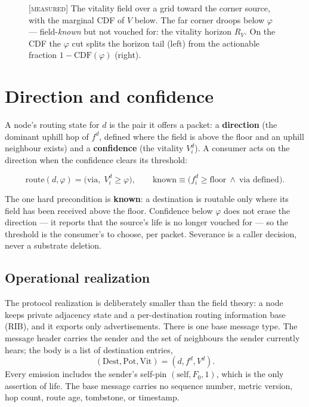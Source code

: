 \documentclass[11pt]{article}
\theoremstyle{plain}
\numberwithin{equation}{section}
\begin{document}
\begin{figure}[tbp]
\centering

\caption{\textsc{[measured]} The vitality field over a grid toward the corner source, with the marginal CDF of $V$ below. The far corner droops below $\varphi$ — field-\emph{known} but not vouched for: the vitality horizon $R_V$. On the CDF the $\varphi$ cut splits the horizon tail (left) from the actionable fraction $1-\mathrm{CDF}(\varphi)$ (right).}
\label{fig:gridV}
\end{figure}

\section{Direction and confidence}\label{sec:direction}

A node's routing state for $d$ is the pair it offers a packet: a \textbf{direction} (the dominant uphill hop of $f^d$, defined where the field is above the floor and an uphill neighbour exists) and a \textbf{confidence} (the vitality $V^d_i$). A consumer acts on the direction when the confidence clears its threshold:

\[
\text{route}(d,\varphi)=\big(\text{via},\;V^d_i\ge\varphi\big),\qquad \text{known}\equiv\big(f^d_i\ge\text{floor}\ \wedge\ \text{via defined}\big).
\]

The one hard precondition is \textbf{known}: a destination is routable only where its field has been received above the floor. Confidence below $\varphi$ does not erase the direction — it reports that the source's life is no longer vouched for — so the threshold is the consumer's to choose, per packet. Severance is a caller decision, never a substrate deletion.

\subsection{Operational realization}\label{sec:operational}

The protocol realization is deliberately smaller than the field theory: a node keeps private adjacency
state and a per-destination routing information base (RIB), and it exports only advertisements.  There
is one base message type.  The message header carries the sender and the set of neighbours the sender
currently hears; the body is a list of destination entries,
\[
(\mathrm{Dest},\mathrm{Pot},\mathrm{Vit})=(d, f^d, V^d).
\]
Every emission includes the sender's self-pin $(\mathrm{self},F_0,1)$, which is the only assertion of
life.  The base message carries no sequence number, metric version, hop count, route age, tombstone, or
timestamp.
\end{document}
